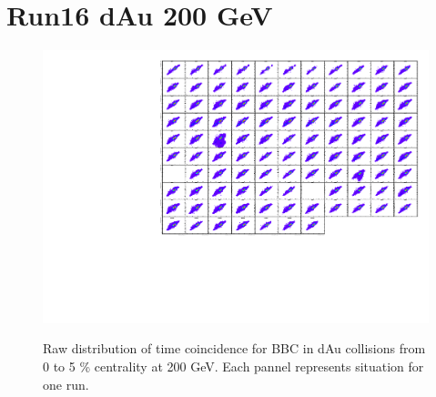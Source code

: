 \documentclass{article}
\begin{document}
\section{Run16 dAu 200 GeV}
\begin{figure}
\includegraphics[width=\textwidth]{fig_pileup/dAu200MB_TimingBBC_TimeTimeBC}\\
\label{fig.dau200mb.bbctimetime}
\caption{Raw distribution of time coincidence for BBC in dAu collisions from 0 to 5 \% centrality at 200 GeV. Each pannel represents situation for one run.}
\end{figure}
\end{document}
